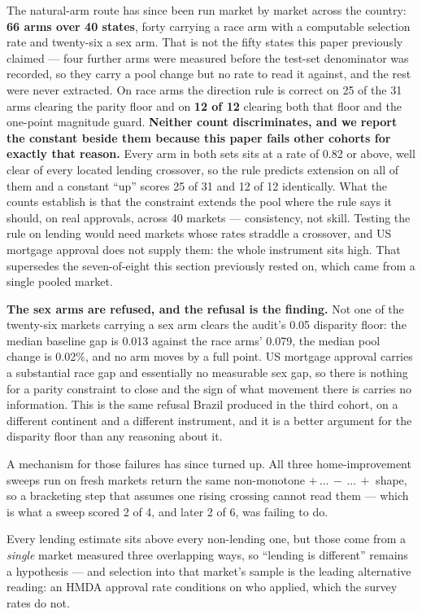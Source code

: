 \documentclass[conference]{IEEEtran}
\begin{document}
The natural-arm route has since been run market by market across the country:
\textbf{66 arms over 40 states}, forty carrying a race arm with a computable selection rate
and twenty-six a sex arm. That is not the fifty states this paper previously claimed --- four
further arms were measured before the test-set denominator was recorded, so they carry a pool
change but no rate to read it against, and the rest were never extracted. On race arms the direction rule is correct on 25 of the 31 arms clearing the parity floor
and on \textbf{12 of 12} clearing both that floor and the one-point magnitude guard.
\textbf{Neither count discriminates, and we report the constant beside them because this
paper fails other cohorts for exactly that reason.} Every arm in both sets sits at a rate of
0.82 or above, well clear of every located lending crossover, so the rule predicts extension
on all of them and a constant ``up'' scores 25 of 31 and 12 of 12 identically. What the
counts establish is that the constraint extends the pool where the rule says it should, on
real approvals, across 40 markets --- consistency, not skill. Testing the rule on lending
would need markets whose rates straddle a crossover, and US mortgage approval does not
supply them: the whole instrument sits high. That supersedes the seven-of-eight this section previously rested
on, which came from a single pooled market.

\textbf{The sex arms are refused, and the refusal is the finding.} Not one of the twenty-six
markets carrying a sex arm clears the audit's 0.05 disparity floor: the median baseline gap
is 0.013 against the race arms' 0.079, the median pool change is 0.02\%, and no arm moves by
a full point. US mortgage approval carries a substantial race gap and essentially no
measurable sex gap, so there is nothing for a parity constraint to close and the sign of what
movement there is carries no information. This is the same refusal Brazil produced in the
third cohort, on a different continent and a different instrument, and it is a better
argument for the disparity floor than any reasoning about it.

A mechanism for those failures has since turned up. All three home-improvement sweeps run
on fresh markets return the same non-monotone \mbox{$+\,\ldots\,-\,\ldots\,+$} shape, so a
bracketing step that assumes one rising crossing cannot read them --- which is what a sweep
scored 2 of 4, and later 2 of 6, was failing to do.

Every lending estimate sits above every non-lending one, but those come from a \emph{single}
market measured three overlapping ways, so ``lending is different'' remains a hypothesis
--- and selection into that market's sample is the leading alternative reading: an HMDA
approval rate conditions on who applied, which the survey rates do not.
\end{document}
